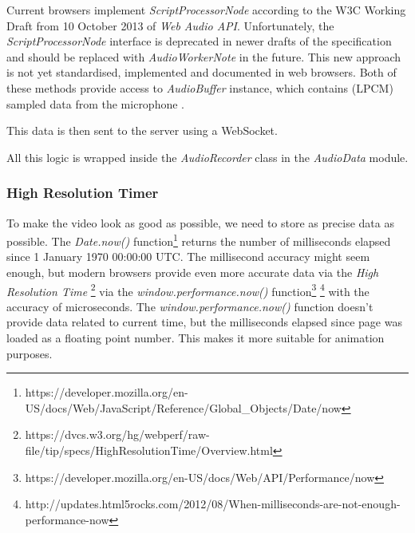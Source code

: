 Current browsers implement \textit{ScriptProcessorNode} according to the W3C Working Draft from 10 October 2013 of \textit{Web Audio API}. Unfortunately, the \textit{ScriptProcessorNode} interface is deprecated in newer drafts of the specification and should be replaced with \textit{AudioWorkerNote} in the future\cite{mic_deprecated}. This new approach is not yet standardised, implemented and documented in web browsers. Both of these methods provide access to \textit{AudioBuffer} instance, which contains  (LPCM)\cite{wiki_pcm} sampled data from the microphone \cite{mic_pcm}.

This data is then sent to the server using a WebSocket. 




All this logic is wrapped inside the \textit{AudioRecorder} class in the \textit{AudioData} module.


\subsubsection{High Resolution Timer}
To make the video look as good as possible, we need to store as precise data as possible. The \textit{Date.now()} function\footnote{https://developer.mozilla.org/en-US/docs/Web/JavaScript/Reference/Global\_Objects/Date/now} returns the number of milliseconds elapsed since 1 January 1970 00:00:00 UTC. The millisecond accuracy might seem enough, but modern browsers provide even more accurate data via the \textit{High Resolution Time} \footnote{https://dvcs.w3.org/hg/webperf/raw-file/tip/specs/HighResolutionTime/Overview.html} via the \textit{window.performance.now()} function\footnote{https://developer.mozilla.org/en-US/docs/Web/API/Performance/now} \footnote{http://updates.html5rocks.com/2012/08/When-milliseconds-are-not-enough-performance-now} with the accuracy of microseconds. The \textit{window.performance.now()} function doesn't provide data related to current time, but the milliseconds elapsed since page was loaded as a floating point number. This makes it more suitable for animation purposes.

